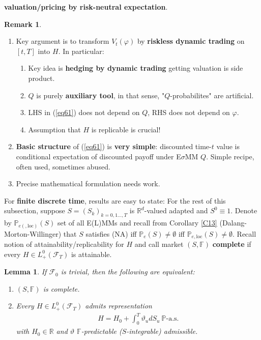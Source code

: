 \documentclass[12pt,a4paper, twoside]{article}
\newtheorem{lem}{Lemma}[section]
\theoremstyle{definition}
\newtheorem{rem}{Remark}[section]
\newcommand{\PP}{\mathbb{P}} %
\begin{document}
\textbf{valuation/pricing by risk-neutral expectation}. 
\newpage
\begin{rem} \
\begin{enumerate}
\item Key argument is to transform $V_t( \varphi)$ by \textbf{riskless dynamic trading} on $[t,T]$ into $H$. In particular:
\begin{enumerate}
\item Key idea is \textbf{hedging by dynamic trading} getting valuation is side product.
\item $Q$ is purely \textbf{auxiliary tool}, in that sense, "$Q$-probabilites" are artificial.
\item LHS in (\ref{eq61}) does not depend on $Q$, RHS does not depend on $\varphi$. 
\item Assumption that $H$ is replicable is crucial!
\end{enumerate}
\item \textbf{Basic structure} of (\ref{eq61}) is \textbf{very simple}: discounted time-$t$ value is conditional expectation of discounted payoff under E$\sigma$MM $Q$. Simple recipe, often used, sometimes abused.
\item Precise mathematical formulation needs work. 
\end{enumerate}
\end{rem}
For \textbf{finite discrete time}, results are easy to state: For the rest of this subsection, suppose $S=(S_k)_{k=0,1 \dots ,T}$ is $\mathbb{R}^d$-valued adapted and $S^0 \equiv 1$. Denote by $\PP_{e(, \text{loc})}(S)$ set of all E(L)MMs and recall from Corollary \ref{C13} (Dalang-Morton-Willinger) that $S$ satisfies (NA) iff $\PP_e(S) \neq \emptyset$ iff $\PP_{e, \text{loc}}(S) \neq \emptyset$. Recall notion of attainability/replicability for $H$ and call market $(S, \mathbb{F})$ \textbf{complete} if every $H \in L_+^0( \mathcal{F}_T)$ is attainable. 
\begin{lem} \label{L61} If $\mathcal{F}_0$ is trivial, then the following are equivalent:
\begin{enumerate}
\item $(S, \mathbb{F})$ is complete.
\item Every $H \in L_+^0( \mathcal{F}_T)$ admits representation 
\begin{align*}
H= H_0 + \int_0^T \vartheta_u dS_u \ \PP\text{-a.s.}
\end{align*}
with $H_0 \in \mathbb{R}$ and $\vartheta$ $\mathbb{F}$-predictable ($S$-integrable) admissible. 
\end{enumerate}
\end{lem}
\end{document}
